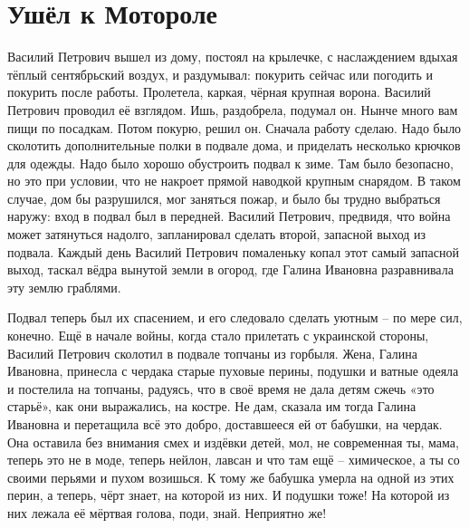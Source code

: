  
 
 
 
 

\section{Ушёл к Мотороле}


Василий Петрович вышел из дому, постоял на крылечке, с наслаждением вдыхая
тёплый сентябрьский воздух, и раздумывал: покурить сейчас или погодить и
покурить после работы. Пролетела, каркая, чёрная крупная ворона. Василий
Петрович проводил её взглядом. Ишь, раздобрела, подумал он. Нынче много вам
пищи по посадкам. Потом покурю, решил он. Сначала работу сделаю. Надо было
сколотить дополнительные полки в подвале дома, и приделать несколько крючков
для одежды. Надо было хорошо обустроить подвал к зиме.  Там было безопасно, но
это при условии, что не накроет прямой наводкой крупным снарядом. В таком
случае, дом бы разрушился, мог заняться пожар, и было бы трудно выбраться
наружу: вход в подвал был в передней. Василий Петрович, предвидя, что война
может затянуться надолго, запланировал сделать второй, запасной выход из
подвала. Каждый день Василий Петрович помаленьку копал этот самый запасной
выход, таскал вёдра вынутой земли в огород, где Галина Ивановна разравнивала
эту землю граблями.

Подвал теперь был их спасением, и его следовало сделать уютным – по мере сил,
конечно. Ещё в начале войны, когда стало прилетать с украинской стороны,
Василий Петрович сколотил в подвале топчаны из горбыля. Жена, Галина Ивановна,
принесла с чердака старые пуховые перины, подушки  и ватные одеяла и постелила
на топчаны, радуясь, что в своё время не дала детям сжечь «это старьё», как они
выражались, на костре. Не дам, сказала им тогда Галина Ивановна и перетащила
всё это добро, доставшееся ей от бабушки, на чердак. Она оставила без внимания
смех и издёвки детей, мол, не современная ты, мама, теперь это не в моде,
теперь нейлон, лавсан и что там ещё – химическое, а ты со своими перьями и
пухом возишься. К тому же бабушка умерла на одной из этих перин, а теперь, чёрт
знает, на которой из них. И подушки тоже! На которой из них лежала её мёртвая
голова, поди, знай. Неприятно же!

